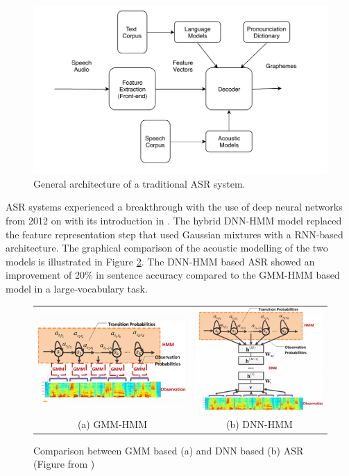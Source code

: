 \begin{figure}[t]
  \centering
  \includegraphics[width=0.8\linewidth]{img/asr2.pdf}
  \caption{General architecture of a traditional ASR system.}
  \label{sota:asr_schema}
\end{figure}

ASR systems experienced a breakthrough with the use of deep neural networks from 2012 on with its introduction in \cite{asr_dnnhmm}. The hybrid DNN-HMM model replaced the feature representation step that used Gaussian mixtures with a RNN-based architecture. The graphical comparison of the acoustic modelling of the two models is illustrated in Figure \ref{sota:gmm-dnn-hmm}. The DNN-HMM based ASR showed an improvement of 20\% in sentence accuracy compared to the GMM-HMM based model in a large-vocabulary task. 

\begin{figure}
\begin{tabular}{cc}
  \includegraphics[width=0.5\linewidth]{img/gmm-hmm.png} &   \includegraphics[width=0.5\linewidth]{img/dnn-hmm.png} \\
(a) GMM-HMM & (b) DNN-HMM\\[6pt]
\end{tabular}
\caption[Comparison between GMM based and DNN based ASR.]{Comparison between GMM based (a) and DNN based (b) ASR (Figure from \cite{asr_dnnhmm})}
\label{sota:gmm-dnn-hmm}
\end{figure}

